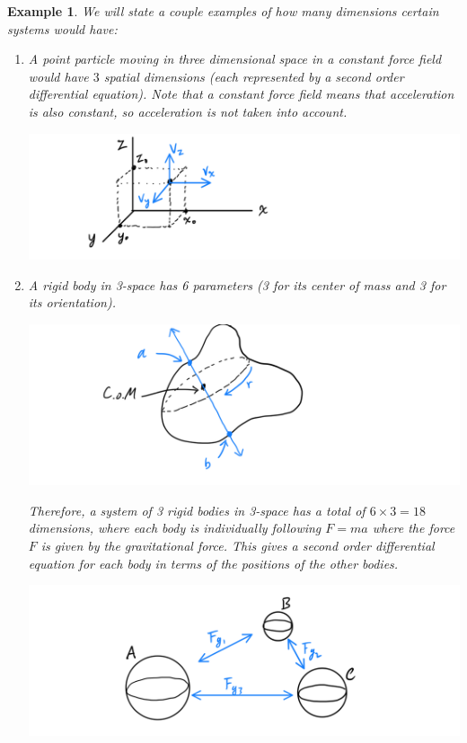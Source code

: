 \documentclass{article}
\newtheorem{example}{Example}[section]
\theoremstyle{remark}
\theoremstyle{definition}
\begin{document}
      \begin{example}
      We will state a couple examples of how many dimensions certain systems would have: 
      \begin{enumerate}
          \item A point particle moving in three dimensional space in a constant force field would have $3$ spatial dimensions (each represented by a second order differential equation). Note that a constant force field means that acceleration is also constant, so acceleration is not taken into account. 
          \begin{center}
              \includegraphics[scale=0.25]{img/Point_Moving_in_Space.PNG}
          \end{center}
          \item A rigid body in 3-space has 6 parameters (3 for its center of mass and 3 for its orientation). 
          \begin{center}
              \includegraphics[scale=0.25]{img/Rigid_Body.PNG}
          \end{center}
          Therefore, a system of 3 rigid bodies in 3-space has a total of $6 \times 3 = 18$ dimensions, where each body is individually following $F = ma$ where the force $F$ is given by the gravitational force. This gives a second order differential equation for each body in terms of the positions of the other bodies. 
          \begin{center}
              \includegraphics[scale=0.25]{img/System_of_3_Rigid_Bodies.PNG}
          \end{center}
      \end{enumerate}
      \end{example}
\end{document}
